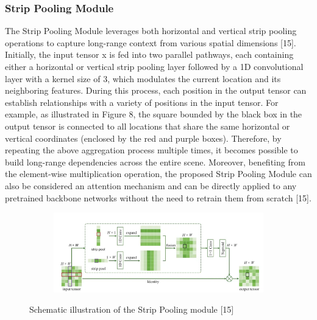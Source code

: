 \documentclass[conference]{IEEEtran}
\begin{document}
\subsubsection{Strip Pooling Module}
The Strip Pooling Module leverages both horizontal and vertical strip pooling operations to capture long-range context from various spatial dimensions [15]. Initially, the input tensor x is fed into two parallel pathways, each containing either a horizontal or vertical strip pooling layer followed by a 1D convolutional layer with a kernel size of 3, which modulates the current location and its neighboring features.
During this process, each position in the output tensor can establish relationships with a variety of positions in the input tensor. For example, as illustrated in Figure 8, the square bounded by the black box in the output tensor is connected to all locations that share the same horizontal or vertical coordinates (enclosed by the red and purple boxes). Therefore, by repeating the above aggregation process multiple times, it becomes possible to build long-range dependencies across the entire scene. Moreover, benefiting from the element-wise multiplication operation, the proposed Strip Pooling Module can also be considered an attention mechanism and can be directly applied to any pretrained backbone networks without the need to retrain them from scratch [15].
\begin{figure}[h]
    \centering
    \begin{subfigure}[t]{0.4\textwidth}
        \centering
        \includegraphics[width=\textwidth]{group/Picture10.png}
    \end{subfigure}%
    \caption{Schematic illustration of the Strip Pooling module [15]}
\end{figure}
\end{document}
